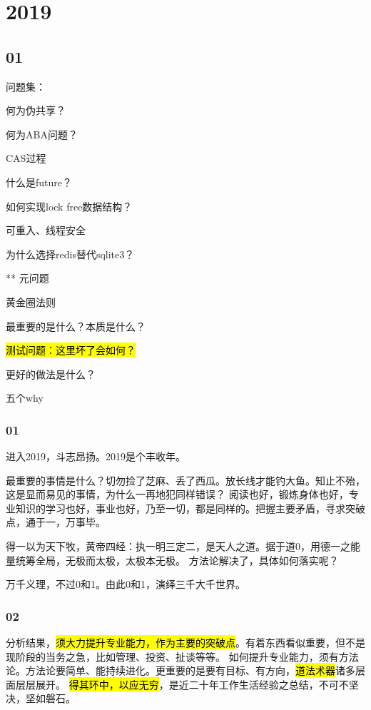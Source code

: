 \chapter{2019}

\section{01}

问题集：
\begin{enumbox}
\item 何为伪共享？
\item 何为ABA问题？
\item CAS过程
\item 什么是future？
\item 如何实现lock free数据结构？
\item 可重入、线程安全
\item 为什么选择redis替代sqlite3？
\item *** 元问题
\item 黄金圈法则
\item 最重要的是什么？本质是什么？
\item \hl{测试问题：这里坏了会如何？}
\item 更好的做法是什么？
\item 五个why
\end{enumbox}

\subsection{01}

进入2019，斗志昂扬。2019是个丰收年。

最重要的事情是什么？切勿捡了芝麻、丢了西瓜。放长线才能钓大鱼。知止不殆，这是显而易见的事情，为什么一再地犯同样错误？
阅读也好，锻炼身体也好，专业知识的学习也好，事业也好，乃至一切，都是同样的。把握主要矛盾，寻求突破点，通于一，万事毕。

得一以为天下牧，黄帝四经：执一明三定二，是天人之道。据于道0，用德一之能量统筹全局，无极而太极，太极本无极。
方法论解决了，具体如何落实呢？

万千义理，不过0和1。由此0和1，演绎三千大千世界。

\subsection{02}

分析结果，\hl{须大力提升专业能力，作为主要的突破点}。有着东西看似重要，但不是现阶段的当务之急，比如管理、投资、扯谈等等。
如何提升专业能力，须有方法论。方法论要简单、能持续进化。更重要的是要有目标、有方向，\hl{道法术器}诸多层面层层展开。
\hl{得其环中，以应无穷}，是近二十年工作生活经验之总结，不可不坚决，坚如磐石。

